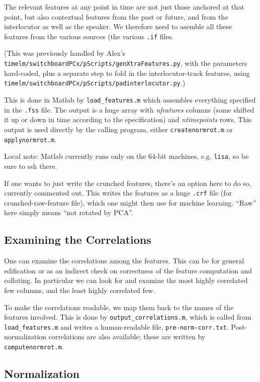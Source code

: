 \documentclass[11pt]{article}
\begin{document}
The relevant features at any point in time are not just those anchored
at that point, but also contextual features from the past or future,
and from the interlocutor as well as the speaker.  We therefore need
to asemble all these features from the various sources (the various
{\tt .if} files.

(This was previously handled by Alex's {\tt
  timelm/switchboardPCx/pScripts/genXtraFeatures.py}, with the
parameters hard-coded, plus a separate step to fold in the
interlocutor-track features, using {\tt
  timelm/switchboardPCx/pScripts/padinterlocutor.py}.)

This is done in Matlab by {\tt load\_features.m} which assembles
everything specified in the {\tt .fss} file.  The output is a huge
array with {\it nfeatures} columns (some shifted it up or down in time
according to the specification) and {\it ntimepoints} rows.  This
output is used directly by the calling program, either
{\tt createnormrot.m} or {\tt applynormrot.m}.

Local note: Matlab currently runs only on the 64-bit machines,
e.g. {\tt lisa}, so be sure to ssh there.

If one wants to just write the crunched features, there's an option
here to do so, currently commented out.  This writes the features as a
huge {\tt .crf} file (for crunched-raw-feature file), which one might
then use for machine learning.  ``Raw'' here simply means ``not
rotated by PCA''.

\subsection{Examining the Correlations}

One can examine the correlations among the features.  This can be for
general edification or as an indirect check on correctness of the
feature computation and collating.   In particular we can look for and
examine the most highly correlated few columns, and the least highly
correlated few.  

To make the correlations readable, we map them back to the names of
the features involved.  This is done by {\tt output\_correlations.m},
which is called from {\tt load\_features.m} and writes a
human-readable file, {\tt pre-norm-corr.txt}.  Post-normalization
correlations are also available; these are written by {\tt computenormrot.m}. 


\subsection{Normalization}
\end{document}
